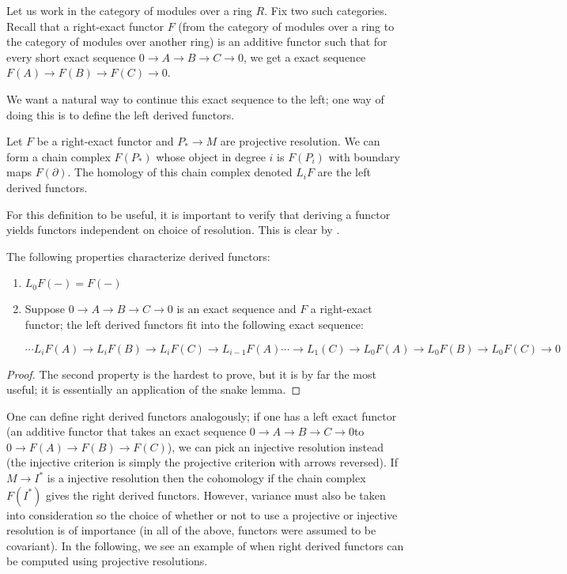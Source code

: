 Let us work in the category of modules over a ring $R$. Fix two such categories.
Recall that a right-exact functor $F$ (from the category of modules over a
ring to the category of modules over another ring) is an additive functor
 such that for every short
exact sequence $0\rightarrow A\rightarrow B\rightarrow
C\rightarrow 0$, we get a exact sequence $F(A)\rightarrow
F(B)\rightarrow F(C)\rightarrow 0$.

We want a natural way to continue this exact sequence to the
left; one way of doing this is to define the left derived
functors.
\begin{definition} Let $F$ be a right-exact functor and
$P_*\rightarrow M$ are projective resolution. We can form a
chain complex $F(P_*)$ whose object in degree $i$ is $F(P_i)$
with boundary maps $F(\partial)$. The homology of this chain
complex denoted $L_iF$ are the left derived functors.
\end{definition}

For this definition to be useful, it is important to verify that
deriving a functor yields functors independent on choice of
resolution. This is clear by \rref{}.

\begin{theorem} The following properties characterize derived
functors: \begin{enumerate}
\item{ $L_0F(-)=F(-)$ }
\item{ Suppose $0\rightarrow A\rightarrow B\rightarrow
C\rightarrow 0$ is an exact sequence and $F$ a right-exact
functor; the left derived functors fit into the following exact
sequence:

\begin{equation} \cdots L_iF(A)\rightarrow L_iF(B)\rightarrow
L_iF(C)\rightarrow L_{i-1}F(A)\cdots\rightarrow
L_1(C)\rightarrow L_0F(A)\rightarrow L_0F(B)\rightarrow
L_0F(C)\rightarrow 0 \end{equation}}
\end{enumerate}
\end{theorem}
\begin{proof} The second property is the hardest to prove, but
it is by far the most useful; it is essentially an application
of the snake lemma. \end{proof}
One can define right derived functors analogously; if one has a
left exact functor (an additive functor that takes an exact
sequence $0\rightarrow A\rightarrow B\rightarrow C\rightarrow 0$to
$0\rightarrow F(A)\rightarrow F(B)\rightarrow F(C)$), we can
pick an injective resolution instead (the injective criterion is simply the
projective criterion with arrows reversed). If
$M\rightarrow I^*$ is a injective resolution then the cohomology if the chain
complex $F(I^*)$ gives the right derived functors.
However, variance must also be taken into consideration so the
choice of whether or not to use a projective or injective
resolution is of importance (in all of the above, functors were
assumed to be covariant). In the following, we see an example of when right
derived functors can be computed using projective
resolutions.

